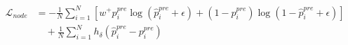 $\begin{aligned}
\mathcal{L}_{node}
&=-\frac{1}{N}\sum_{i=1}^{N}\left[
w^+p_i^{pre}\log\left(\hat{p}_i^{pre}+\epsilon\right)
+
\left(1-p_i^{pre}\right)\log\left(1-\hat{p}_i^{pre}+\epsilon\right)
\right]\\
&\quad+\frac{1}{N}\sum_{i=1}^{N}h_{\delta}\left(\hat{p}_i^{pre}-p_i^{pre}\right)
\end{aligned}$

